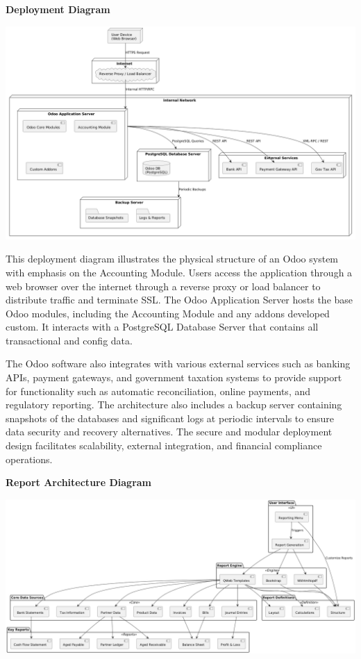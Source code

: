 \documentclass[11pt,a4paper]{article}
\begin{document}
\noindent\textbf{Deployment Diagram}
\begin{center}
    \includegraphics[width=\linewidth]{diagram/Deployment_Diagram.png}
\end{center}

\noindent This deployment diagram illustrates the physical structure of an Odoo system with emphasis on 
the Accounting Module. Users access the application through a web browser over the internet 
through a reverse proxy or load balancer to distribute traffic and terminate SSL. The Odoo 
Application Server hosts the base Odoo modules, including the Accounting Module and any 
addons developed custom. It interacts with a PostgreSQL Database Server that contains all 
transactional and config data.
\medskip

\noindent The Odoo software also integrates with various external services such as banking APIs, payment 
gateways, and government taxation systems to provide support for functionality such as 
automatic reconciliation, online payments, and regulatory reporting. The architecture also 
includes a backup server containing snapshots of the databases and significant logs at periodic 
intervals to ensure data security and recovery alternatives. The secure and modular deployment 
design facilitates scalability, external integration, and financial compliance operations.
\bigskip

\newpage
\noindent\textbf{Report Architecture Diagram}
\begin{center}
    \includegraphics[width=\linewidth]{diagram/report_architecture.png}
\end{center}
\medskip
\end{document}
